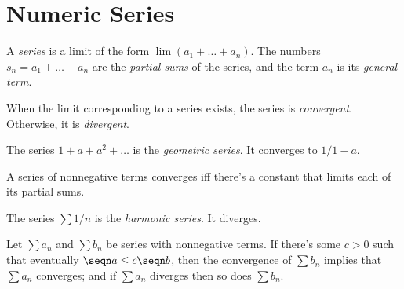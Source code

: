 \setcounter{section}{3}
\section{Numeric Series}

\begin{definition}
	A \emph{series} is a limit of the form $\lim (a_1 + \dots + a_n)$.
	The numbers $s_n = a_1 + \dots + a_n$ are the \emph{partial sums} of the series, 
	and the term $a_n$ is its \emph{general term}.
\end{definition}

\begin{definition}[Congervence]
	When the limit corresponding to a series exists, the series is \emph{convergent}.
	Otherwise, it is \emph{divergent}.
\end{definition}

\begin{fact}
	The series $1 + a + a^2 + \dots$ is the \emph{geometric series}. It converges to $1/1-a$.
\end{fact}

\begin{fact}
	A series of nonnegative terms converges iff there's a constant that limits
	each of its partial sums.  
\end{fact}

\begin{fact}
	The series $\sum 1/n$ is the \emph{harmonic series}. It diverges.
\end{fact}

\begin{theorem}
	Let $\sum a_n$ and $\sum b_n$ be series with nonnegative terms. If there's some $c>0$
	such that eventually $\seqn a \le c\seqn b$, then the convergence of $\sum b_n$
	implies that $\sum a_n$ converges; and if $\sum a_n$ diverges then so does $\sum b_n$.
\end{theorem}
